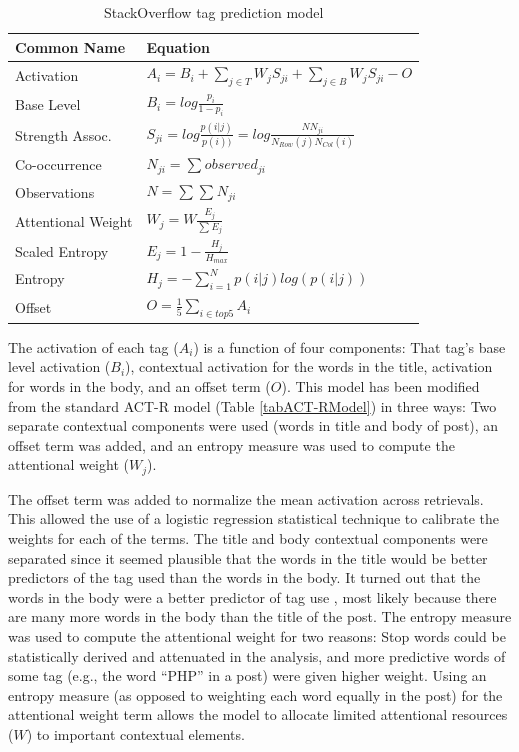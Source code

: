 \documentclass[man,floatsintext,donotrepeattitle]{apa6}
\begin{document}
\begin{table}[!ht]
  \caption{StackOverflow tag prediction model}
  \label{tabModACTRModel}
  {\tabulinesep=1.2mm
    \begin{tabu}{ll}
      \hline
      Common Name &  Equation \\
      \hline
      Activation & 		$A_{i} = B_{i} + \sum_{j\in T}^{ } W_{j} S_{ji} + \sum_{j\in B}^{ } W_{j} S_{ji} - O$ \\
      Base Level & 		$B_{i} = log \frac{p_{i}}{1-p_{i}}$ \\
      Strength Assoc. &		$S_{ji} = log \frac{p(i|j)}{p(i))} = log \frac{NN_{ji}}{N_{Row}(j)N_{Col}(i)}$ \\
      Co-occurrence &		$N_{ji} = \sum_{}^{}{observed_{ji}}$ \\
      Observations &		$N = \sum_{}^{}{\sum_{}^{}{N_{ji}}}$ \\
      Attentional Weight& 	$W_{j} = W \frac{E_{j}} {\sum_{}^{} {E_{j}}} $ \\
      Scaled Entropy & 		$E_{j} = 1-\frac{H_{j}}{H_{max}}$ \\
      Entropy & 		$H_{j} = -\sum_{i=1}^{N}p(i|j)log\left (  p(i|j) \right )$ \\
      Offset & 			$O = \frac{1}{5}\sum_{i\in top 5}^{ } A_{i}$ \\
      \hline
    \end{tabu}
  }
\end{table}

The activation of each tag ($A_{i}$) is a function of four components:
That tag's base level activation ($B_{i}$), contextual activation for the words in the title, activation for words in the body, and an offset term ($O$).
This model has been modified from the standard ACT-R model (Table \ref{tabACT-RModel}) in three ways:
Two separate contextual components were used (words in title and body of post), an offset term was added, and an entropy measure was used to compute the attentional weight ($W_{j}$).

The offset term was added to normalize the mean activation across retrievals.
This allowed the use of a logistic regression statistical technique to calibrate the weights for each of the terms.
The title and body contextual components were separated since it seemed plausible that the words in the title would be better predictors of the tag used than the words in the body.
It turned out that the words in the body were a better predictor of tag use \parencite{Stanley2013}, most likely because there are many more words in the body than the title of the post.
The entropy measure was used to compute the attentional weight for two reasons:
Stop words could be statistically derived and attenuated in the analysis, and more predictive words of some tag (e.g., the word ``PHP'' in a post) were given higher weight.
Using an entropy measure (as opposed to weighting each word equally in the post) for the attentional weight term allows the model to allocate limited attentional resources ($W$) to important contextual elements.
\end{document}
